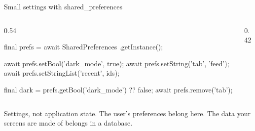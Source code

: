 \documentclass[10pt,aspectratio=169,t]{beamer}
\begin{document}
\begin{frame}[fragile,eyebrow=Storage]{Small settings with shared\_preferences}
  \begin{columns}[T]
    \begin{column}{0.54\textwidth}
\begin{dart}
final prefs = await SharedPreferences
    .getInstance();

await prefs.setBool('dark_mode', true);
await prefs.setString('tab', 'feed');
await prefs.setStringList('recent', ids);

final dark = prefs.getBool('dark_mode')
    ?? false;
await prefs.remove('tab');
\end{dart}
    \end{column}
    \begin{column}{0.42\textwidth}
      \vskip 2mm
    \end{column}
  \end{columns}
  \begin{takeaway}{Settings, not application state.}
    The user's preferences belong here. The data your screens are made of belongs in a database.
  \end{takeaway}
\end{frame}
\end{document}
